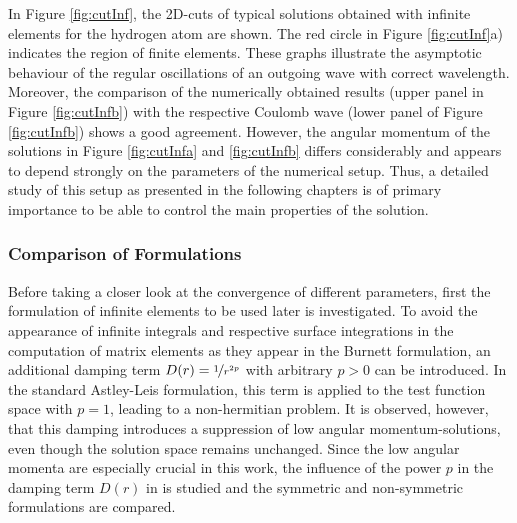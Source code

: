 In Figure \ref{fig:cutInf}, the 2D-cuts of typical solutions obtained with infinite elements for the hydrogen atom are shown.
The red circle in Figure \ref{fig:cutInf}a) indicates the region of finite elements.
These graphs illustrate the  asymptotic behaviour of the regular oscillations of an outgoing wave with correct wavelength.
Moreover, the comparison of the numerically obtained results (upper panel in Figure \ref{fig:cutInfb}) with the respective Coulomb wave (lower panel of Figure \ref{fig:cutInfb}) shows a good agreement.
However, the angular momentum of the solutions in Figure \ref{fig:cutInfa} and \ref{fig:cutInfb} differs considerably and appears to depend strongly on the parameters of the numerical setup.
Thus, a detailed study of this setup as presented in the following chapters is of primary importance to be able to control the main properties of the solution.

\subsubsection{Comparison of Formulations}
\label{ch:bmFormul}
Before taking a closer look at the convergence of different parameters, first the formulation of infinite elements to be used later is investigated.
To avoid the appearance of infinite integrals and respective surface integrations in the computation of matrix elements as they appear in the Burnett formulation, an additional damping term $D(r)=\nicefrac{1}{r^{2p}}$ with arbitrary $p>0$ can be introduced.
In the standard Astley-Leis formulation, this term is applied to the test function space with $p=1$, leading to a non-hermitian problem.
It is observed, however, that this damping introduces a suppression of low angular momentum-solutions, even though the solution space remains unchanged.
Since the low angular momenta are especially crucial in this work, the influence of the power $p$ in the damping term $D(r)$ in  is studied and the symmetric and non-symmetric formulations are compared.

